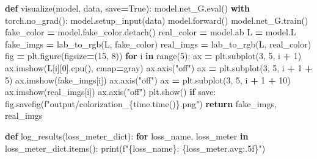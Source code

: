 \documentclass[
]{article}
\newenvironment{Shaded}{\begin{snugshade}}{\end{snugshade}}
\newcommand{\BuiltInTok}[1]{#1}
\newcommand{\ControlFlowTok}[1]{\textcolor[rgb]{0.13,0.29,0.53}{\textbf{#1}}}
\newcommand{\DecValTok}[1]{\textcolor[rgb]{0.00,0.00,0.81}{#1}}
\newcommand{\KeywordTok}[1]{\textcolor[rgb]{0.13,0.29,0.53}{\textbf{#1}}}
\newcommand{\NormalTok}[1]{#1}
\newcommand{\OperatorTok}[1]{\textcolor[rgb]{0.81,0.36,0.00}{\textbf{#1}}}
\newcommand{\SpecialCharTok}[1]{\textcolor[rgb]{0.00,0.00,0.00}{#1}}
\newcommand{\SpecialStringTok}[1]{\textcolor[rgb]{0.31,0.60,0.02}{#1}}
\newcommand{\StringTok}[1]{\textcolor[rgb]{0.31,0.60,0.02}{#1}}
\newcommand{\VariableTok}[1]{\textcolor[rgb]{0.00,0.00,0.00}{#1}}
\begin{document}
\begin{Shaded}
\begin{Highlighting}[]
\KeywordTok{def}\NormalTok{ visualize(model, data, save}\OperatorTok{=}\VariableTok{True}\NormalTok{):}
\NormalTok{    model.net\_G.}\BuiltInTok{eval}\NormalTok{()}
    \ControlFlowTok{with}\NormalTok{ torch.no\_grad():}
\NormalTok{        model.setup\_input(data)}
\NormalTok{        model.forward()}
\NormalTok{    model.net\_G.train()}
\NormalTok{    fake\_color }\OperatorTok{=}\NormalTok{ model.fake\_color.detach()}
\NormalTok{    real\_color }\OperatorTok{=}\NormalTok{ model.ab}
\NormalTok{    L }\OperatorTok{=}\NormalTok{ model.L}
\NormalTok{    fake\_imgs }\OperatorTok{=}\NormalTok{ lab\_to\_rgb(L, fake\_color)}
\NormalTok{    real\_imgs }\OperatorTok{=}\NormalTok{ lab\_to\_rgb(L, real\_color)}
\NormalTok{    fig }\OperatorTok{=}\NormalTok{ plt.figure(figsize}\OperatorTok{=}\NormalTok{(}\DecValTok{15}\NormalTok{, }\DecValTok{8}\NormalTok{))}
    \ControlFlowTok{for}\NormalTok{ i }\KeywordTok{in} \BuiltInTok{range}\NormalTok{(}\DecValTok{5}\NormalTok{):}
\NormalTok{        ax }\OperatorTok{=}\NormalTok{ plt.subplot(}\DecValTok{3}\NormalTok{, }\DecValTok{5}\NormalTok{, i }\OperatorTok{+} \DecValTok{1}\NormalTok{)}
\NormalTok{        ax.imshow(L[i][}\DecValTok{0}\NormalTok{].cpu(), cmap}\OperatorTok{=}\StringTok{\textquotesingle{}gray\textquotesingle{}}\NormalTok{)}
\NormalTok{        ax.axis(}\StringTok{"off"}\NormalTok{)}
\NormalTok{        ax }\OperatorTok{=}\NormalTok{ plt.subplot(}\DecValTok{3}\NormalTok{, }\DecValTok{5}\NormalTok{, i }\OperatorTok{+} \DecValTok{1} \OperatorTok{+} \DecValTok{5}\NormalTok{)}
\NormalTok{        ax.imshow(fake\_imgs[i])}
\NormalTok{        ax.axis(}\StringTok{"off"}\NormalTok{)}
\NormalTok{        ax }\OperatorTok{=}\NormalTok{ plt.subplot(}\DecValTok{3}\NormalTok{, }\DecValTok{5}\NormalTok{, i }\OperatorTok{+} \DecValTok{1} \OperatorTok{+} \DecValTok{10}\NormalTok{)}
\NormalTok{        ax.imshow(real\_imgs[i])}
\NormalTok{        ax.axis(}\StringTok{"off"}\NormalTok{)}
\NormalTok{    plt.show()}
    \ControlFlowTok{if}\NormalTok{ save:}
\NormalTok{        fig.savefig(}\SpecialStringTok{f"output/colorization\_}\SpecialCharTok{\{}\NormalTok{time}\SpecialCharTok{.}\NormalTok{time()}\SpecialCharTok{\}}\SpecialStringTok{.png"}\NormalTok{)}
    \ControlFlowTok{return}\NormalTok{ fake\_imgs, real\_imgs}
        
\KeywordTok{def}\NormalTok{ log\_results(loss\_meter\_dict):}
    \ControlFlowTok{for}\NormalTok{ loss\_name, loss\_meter }\KeywordTok{in}\NormalTok{ loss\_meter\_dict.items():}
        \BuiltInTok{print}\NormalTok{(}\SpecialStringTok{f"}\SpecialCharTok{\{}\NormalTok{loss\_name}\SpecialCharTok{\}}\SpecialStringTok{: }\SpecialCharTok{\{}\NormalTok{loss\_meter}\SpecialCharTok{.}\NormalTok{avg}\SpecialCharTok{:.5f\}}\SpecialStringTok{"}\NormalTok{)}
\end{Highlighting}
\end{Shaded}
\end{document}
